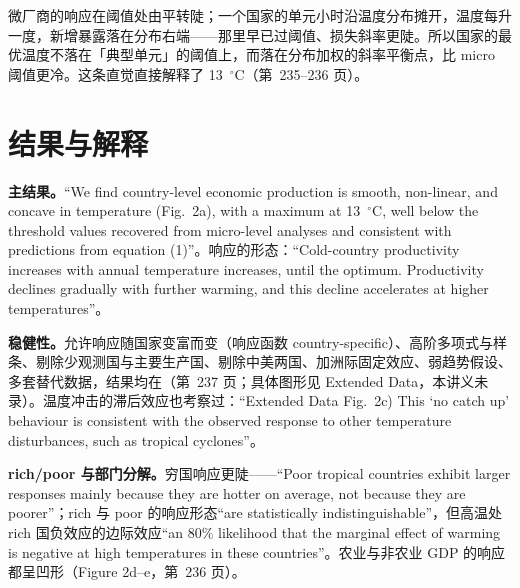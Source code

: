 \begin{intuition}[为什么聚合会压低最优温度]
微厂商的响应在阈值处由平转陡；一个国家的单元小时沿温度分布摊开，温度每升一度，新增暴露落在分布右端——那里早已过阈值、损失斜率更陡。所以国家的最优温度不落在「典型单元」的阈值上，而落在分布加权的斜率平衡点，比 micro 阈值更冷。这条直觉直接解释了 13~$^\circ$C（第~235--236 页）。
\end{intuition}

\section{结果与解释}

\textbf{主结果。}``We find country-level economic production is smooth, non-linear, and concave in temperature (Fig.~2a), with a maximum at 13~$^\circ$C, well below the threshold values recovered from micro-level analyses and consistent with predictions from equation (1)''\citep[第~236 页]{burke2015global}。响应的形态：``Cold-country productivity increases with annual temperature increases, until the optimum. Productivity declines gradually with further warming, and this decline accelerates at higher temperatures''\citep[第~236 页]{burke2015global}。

\textbf{稳健性。}允许响应随国家变富而变（响应函数 country-specific）、高阶多项式与样条、剔除少观测国与主要生产国、剔除中美两国、加洲际固定效应、弱趋势假设、多套替代数据，结果均在（第~237 页；具体图形见 Extended Data，本讲义未录）。温度冲击的滞后效应也考察过：``Extended Data Fig.~2c) This `no catch up' behaviour is consistent with the observed response to other temperature disturbances, such as tropical cyclones''\citep[第~237 页]{burke2015global}。

\textbf{rich/poor 与部门分解。}穷国响应更陡——``Poor tropical countries exhibit larger responses mainly because they are hotter on average, not because they are poorer''\citep[第~237 页]{burke2015global}；rich 与 poor 的响应形态``are statistically indistinguishable''\citep[第~237 页]{burke2015global}，但高温处 rich 国负效应的边际效应``an 80\% likelihood that the marginal effect of warming is negative at high temperatures in these countries''\citep[第~237 页]{burke2015global}。农业与非农业 GDP 的响应都呈凹形（Figure 2d--e，第~236 页）。

